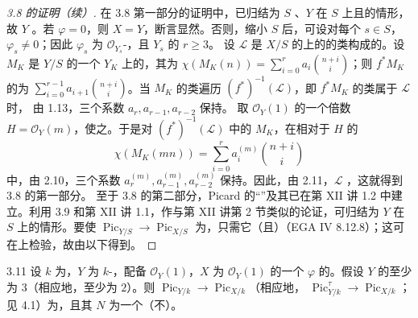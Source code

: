 \begin{proof}[ 3.8 的证明（续）]
在 3.8 第一部分的证明中，已归结为 $S$ 、$Y$ 在 $S$ 上且的情形，故 $Y$ 。若 $\varphi=0$，则 $X=Y$，断言显然。否则，缩小 $S$ 后，可设对每个 $s\in S$，$\varphi_s\neq0$；因此 $\varphi_s$ 为 $\mathcal O_{Y_s}$-，且 $Y_s$ 的 $r\geq3$。
设 $\mathscr L$ 是 $X/S$ 的上的的类构成的。设 $M_K$ 是 $Y/S$ 的一个 $Y_K$ 上的，其为 $\chi(M_K(n))=\sum_{i=0}^r a_i\binom{n+i}{i}$；则 $f^*M_K$ 的为 $\sum_{i=0}^{r-1}a_{i+1}\binom{n+i}{i}$。当 $M_K$ 的类遍历 $(f^*)^{-1}(\mathscr L)$，即 $f^*M_K$ 的类属于 $\mathscr L$ 时，
由 1.13，三个系数 $a_r,a_{r-1},a_{r-2}$ 保持。
取 $\mathcal O_Y(1)$ 的一个倍数 $H=\mathcal O_Y(m)$，使之。于是对 $(f^*)^{-1}(\mathscr L)$ 中的 $M_K$，在相对于 $H$ 的
\[\chi(M_K(mn))=\sum_{i=0}^r a_i^{(m)}\binom{n+i}{i}\]
中，由 2.10，三个系数 $a_r^{(m)},a_{r-1}^{(m)},a_{r-2}^{(m)}$ 保持。因此，由 2.11，$\mathscr L$ ，这就得到 3.8 的第一部分。
至于 3.8 的第二部分，Picard 的“”及其已在第 XII 讲 1.2 中建立。利用 3.9 和第 XII 讲 1.1，作与第 XII 讲第 2 节类似的论证，可归结为 $Y$ 在 $S$ 上的情形。要使 $\operatorname{Pic}_{Y/S}\to\operatorname{Pic}_{X/S}$ 为，只需它（且）（EGA IV 8.12.8）；这可在上检验，故由以下得到。
\end{proof}
\begin{SGAresult}{}{3.11}
设 $k$ 为，$Y$ 为 $k$-，配备 $\mathcal O_Y(1)$，$X$ 为 $\mathcal O_Y(1)$ 的一个 $\varphi$ 的。假设 $Y$ 的至少为 $3$（相应地，至少为 $2$）。则 $\operatorname{Pic}_{Y/k}\to\operatorname{Pic}_{X/k}$（相应地， $\operatorname{Pic}_{Y/k}^{\tau}\to\operatorname{Pic}_{X/k}$；见 4.1）为，且其 $N$ 为一个（不）。
\end{SGAresult}
